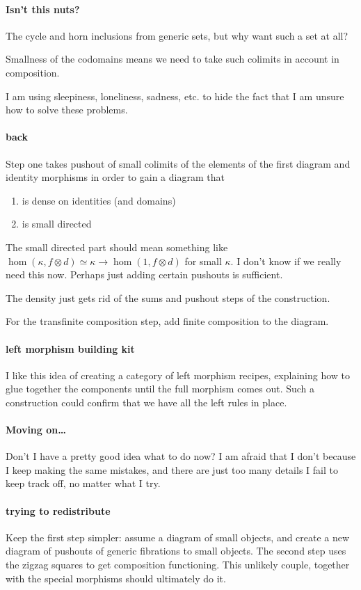 \documentclass[csh.tex]{subfiles}
\begin{document}
\paragraph{Isn't this nuts?}
The cycle and horn inclusions from generic sets, but why want such a set at all?

Smallness of the codomains means we need to take such colimits in account in composition. 

I am using sleepiness, loneliness, sadness, etc. to hide the fact that I am unsure how to solve these problems.

\paragraph{back}
Step one takes pushout of small colimits of the elements of the first diagram and identity morphisms in order to gain a diagram that
\begin{enumerate}
\item is dense on identities (and domains)
\item is small directed
\end{enumerate}
The small directed part should mean something like $\hom(\kappa, f\otimes d)\simeq \kappa\to\hom(1,f\otimes d)$ for small $\kappa$. I don't know if we really need this now. Perhaps just adding certain pushouts is sufficient.

The density just gets rid of the sums and pushout steps of the construction.

For the transfinite composition step, add finite composition to the diagram.

\paragraph{left morphism building kit}
I like this idea of creating a category of left morphism recipes, explaining how to glue together the components until the full morphism comes out. Such a construction could confirm that we have all the left rules in place.

\paragraph{Moving on\dots}
Don't I have a pretty good idea what to do now? I am afraid that I don't because I keep making the same mistakes, and there are just too many details I fail to keep track off, no matter what I try.


\paragraph{trying to redistribute}
Keep the first step simpler: assume a diagram of small objects, and create a new diagram of pushouts of generic fibrations to small objects.
The second step uses the zigzag squares to get composition functioning.
This unlikely couple, together with the special morphisms should ultimately do it.
\end{document}
